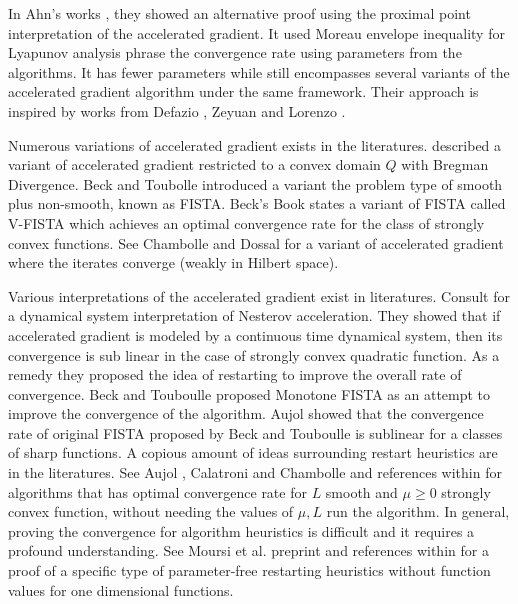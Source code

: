 \documentclass[12pt]{article}
\begin{document}
        \par
        In Ahn's works \cite{ahn_understanding_2022}, they showed an alternative proof using the proximal point interpretation of the accelerated gradient. 
        It used Moreau envelope inequality for Lyapunov analysis phrase the convergence rate using parameters from the algorithms.  
        It has fewer parameters while still encompasses several variants of the accelerated gradient algorithm under the same framework. 
        Their approach is inspired by works from Defazio \cite{defazio_curved_2019}, Zeyuan and Lorenzo \cite{allen-zhu_linear_2016}. 
        
        \par
        Numerous variations of accelerated gradient exists in the literatures. \cite[(6.1.19)]{nesterov_lectures_2018} described a variant of accelerated gradient restricted to a convex domain $Q$ with Bregman Divergence. 
        Beck and Toubolle \cite{beck_fast_2009} introduced a variant the problem type of smooth plus non-smooth, known as FISTA. 
        Beck's Book \cite[(10.7.7)]{beck_first-order_2017} states a variant of FISTA called V-FISTA which achieves an optimal convergence rate for the class of strongly convex functions. 
        See Chambolle and Dossal \cite{chambolle_convergence_2015} for a variant of accelerated gradient where the iterates converge (weakly in Hilbert space). 
        
        \par
        Various interpretations of the accelerated gradient exist in literatures. 
        Consult \cite{su_differential_2016} for a dynamical system interpretation of Nesterov acceleration. 
        They showed that if accelerated gradient is modeled by a continuous time dynamical system, then its convergence is sub linear in the case of strongly convex quadratic function. 
        As a remedy they proposed the idea of restarting to improve the overall rate of convergence. 
        Beck and Touboulle \cite{beck_fast_2009} proposed Monotone FISTA as an attempt to improve the convergence of the algorithm. 
        Aujol \cite{aujol_optimal_2019} showed that the convergence rate of original FISTA proposed by Beck and Touboulle \cite{beck_fast_2009} is sublinear for a classes of sharp functions. 
        A copious amount of ideas surrounding restart heuristics are in the literatures. 
        See Aujol \cite{aujol_parameter-free_2024}, Calatroni and Chambolle \cite{calatroni_backtracking_2019} and references within for algorithms that has optimal convergence rate for $L$ smooth and $\mu \ge 0$ strongly convex function, without needing the values of $\mu, L$ run the algorithm. 
        In general, proving the convergence for algorithm heuristics is difficult and it requires a profound understanding. 
        See Moursi et al. \cite{moursi_accelerated_2023} preprint and references within for a proof of a specific type of parameter-free restarting heuristics without function values for one dimensional functions. 
\end{document}
